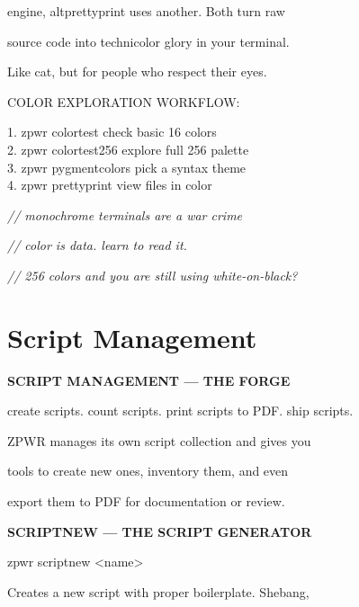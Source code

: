 \documentclass[11pt,a4paper,twoside]{book}
\begin{document}
engine, altprettyprint uses another. Both turn raw

source code into technicolor glory in your terminal.

Like cat, but for people who respect their eyes.

COLOR EXPLORATION WORKFLOW:

\begin{codebox}
1. zpwr colortest        check basic 16 colors\\
2. zpwr colortest256     explore full 256 palette\\
3. zpwr pygmentcolors    pick a syntax theme\\
4. zpwr prettyprint      view files in color\\
\end{codebox}

{\small\itshape\color{dimtext} // monochrome terminals are a war crime}

{\small\itshape\color{dimtext} // color is data. learn to read it.}

{\small\itshape\color{dimtext} // 256 colors and you are still using white-on-black?}


\vspace{16pt}

\section{Script Management}


\vspace{10pt}
{\large\bfseries\color{neoncyan} SCRIPT MANAGEMENT — THE FORGE}\vspace{6pt}

create scripts. count scripts. print scripts to PDF. ship scripts.

ZPWR manages its own script collection and gives you

tools to create new ones, inventory them, and even

export them to PDF for documentation or review.


\vspace{12pt}
{\bfseries\color{neonyellow} SCRIPTNEW — THE SCRIPT GENERATOR}\vspace{4pt}

\begin{codebox}
zpwr scriptnew <name>\\
\end{codebox}

Creates a new script with proper boilerplate. Shebang,
\end{document}
